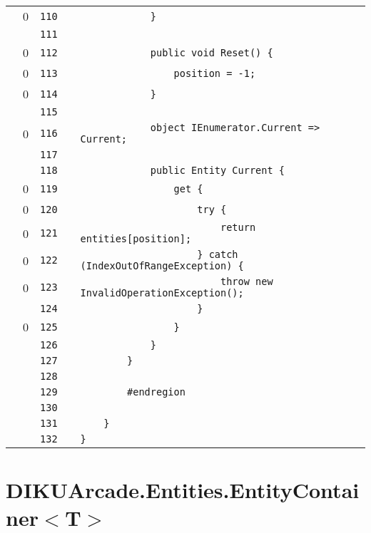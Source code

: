 \documentclass[a4paper,landscape,10pt]{article}
\begin{document}
\begin{longtable}[l]{lrrll}
\cellcolor{red} & 0 & \verb~110~ & & \verb~            }~\\
\cellcolor{gray} &  & \verb~111~ & & \verb~~\\
\cellcolor{red} & 0 & \verb~112~ & & \verb~            public void Reset() {~\\
\cellcolor{red} & 0 & \verb~113~ & & \verb~                position = -1;~\\
\cellcolor{red} & 0 & \verb~114~ & & \verb~            }~\\
\cellcolor{gray} &  & \verb~115~ & & \verb~~\\
\cellcolor{red} & 0 & \verb~116~ & & \verb~            object IEnumerator.Current => Current;~\\
\cellcolor{gray} &  & \verb~117~ & & \verb~~\\
\cellcolor{gray} &  & \verb~118~ & & \verb~            public Entity Current {~\\
\cellcolor{red} & 0 & \verb~119~ & & \verb~                get {~\\
\cellcolor{red} & 0 & \verb~120~ & & \verb~                    try {~\\
\cellcolor{red} & 0 & \verb~121~ & & \verb~                        return entities[position];~\\
\cellcolor{red} & 0 & \verb~122~ & & \verb~                    } catch (IndexOutOfRangeException) {~\\
\cellcolor{red} & 0 & \verb~123~ & & \verb~                        throw new InvalidOperationException();~\\
\cellcolor{gray} &  & \verb~124~ & & \verb~                    }~\\
\cellcolor{red} & 0 & \verb~125~ & & \verb~                }~\\
\cellcolor{gray} &  & \verb~126~ & & \verb~            }~\\
\cellcolor{gray} &  & \verb~127~ & & \verb~        }~\\
\cellcolor{gray} &  & \verb~128~ & & \verb~~\\
\cellcolor{gray} &  & \verb~129~ & & \verb~        #endregion~\\
\cellcolor{gray} &  & \verb~130~ & & \verb~~\\
\cellcolor{gray} &  & \verb~131~ & & \verb~    }~\\
\cellcolor{gray} &  & \verb~132~ & & \verb~}~\\
\end{longtable}
\newpage
\section{DIKUArcade.Entities.EntityContainer$<$T$>$}
\end{document}
